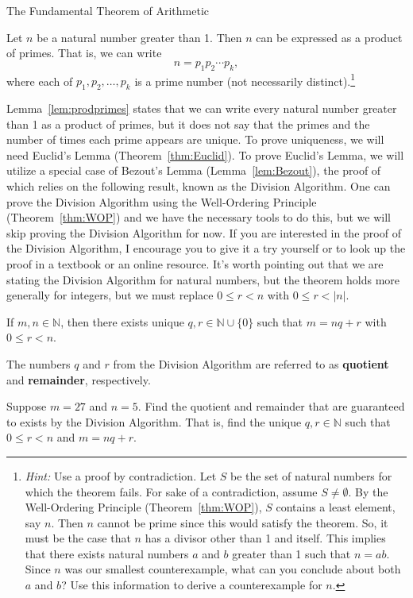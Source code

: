 \begin{section}{The Fundamental Theorem of Arithmetic}
\begin{lemma}\label{lem:prodprimes}
Let $n$ be a natural number greater than 1.  Then $n$ can be expressed as a product of primes.  That is, we can write
\[
n=p_1 p_2 \cdots p_k,
\]
where each of $p_1, p_2, \ldots, p_k$ is a prime number (not necessarily distinct).\footnote{\emph{Hint:} Use a proof by contradiction.  Let $S$ be the set of natural numbers for which the theorem fails.  For sake of a contradiction, assume $S\neq \emptyset$.  By the Well-Ordering Principle (Theorem~\ref{thm:WOP}), $S$ contains a least element, say $n$. Then $n$ cannot be prime since this would satisfy the theorem.  So, it must be the case that $n$ has a divisor other than 1 and itself.  This implies that there exists natural numbers $a$ and $b$ greater than 1 such that $n=ab$.  Since $n$ was our smallest counterexample, what can you conclude about both $a$ and $b$?  Use this information to derive a counterexample for $n$.}
\end{lemma}

Lemma~\ref{lem:prodprimes} states that we can write every natural number greater than 1 as a product of primes, but it does not say that the primes and the number of times each prime appears are unique.  To prove uniqueness, we will need Euclid's Lemma (Theorem~\ref{thm:Euclid}). To prove Euclid's Lemma, we will utilize a special case of Bezout's Lemma (Lemma~\ref{lem:Bezout}), the proof of which relies on the following result, known as the Division Algorithm. One can prove the Division Algorithm using the Well-Ordering Principle (Theorem~\ref{thm:WOP}) and we have the necessary tools to do this, but we will skip proving the Division Algorithm for now. If you are interested in the proof of the Division Algorithm, I encourage you to give it a try yourself or to look up the proof in a textbook or an online resource.  It's worth pointing out that we are stating the Division Algorithm for natural numbers, but the theorem holds more generally for integers, but we must replace $0\leq r<n$ with $0\leq r<|n|$.

\begin{theorem}\label{thm:DivisonAlgorthm}
If $m,n\in\mathbb{N}$, then there exists unique $q,r\in\mathbb{N}\cup\{0\}$ such that $m=nq+r$ with $0\leq r<n$.
\end{theorem}

The numbers $q$ and $r$ from the Division Algorithm are referred to as \textbf{quotient} and \textbf{remainder}, respectively.

\begin{exercise}
Suppose $m=27$ and $n=5$. Find the quotient and remainder that are guaranteed to exists by the Division Algorithm.  That is, find the unique $q,r\in\mathbb{N}$ such that $0\leq r<n$ and $m=nq+r$.
\end{exercise}


\end{section}

